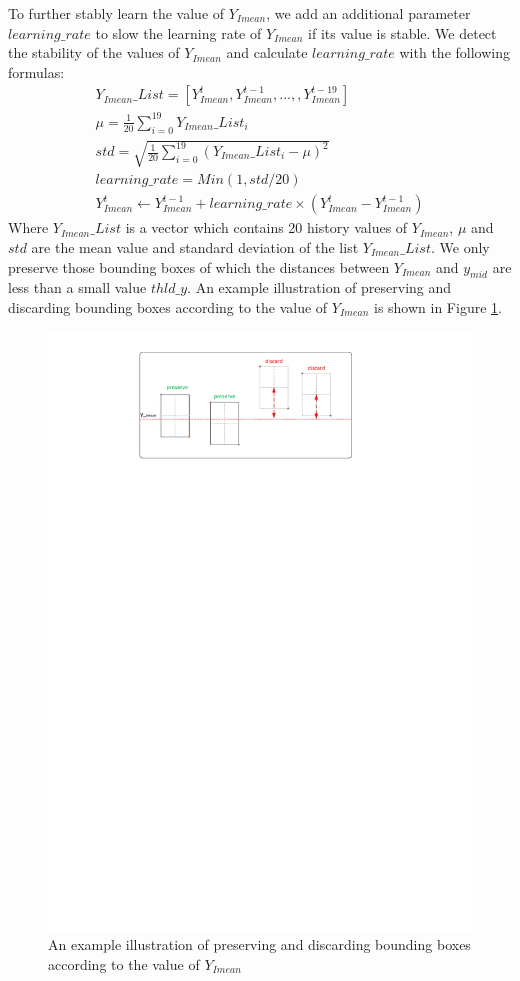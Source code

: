 To further stably learn the value of \(Y_{Imean}\), we add an additional parameter \(learning\_rate\) to slow the learning rate of \(Y_{Imean}\) if its value is stable. We detect the stability of the values of \(Y_{Imean}\) and calculate \(learning\_rate\) with the following formulas: 
\begin{eqnarray}
	Y_{Imean}\_List = [Y_{Imean}^t,Y_{Imean}^{t-1},...,,Y_{Imean}^{t-19}] \\
	\mu = \frac{1}{20}\sum_{i=0}^{19}Y_{Imean}\_List_i \\
	std = \sqrt{\frac{1}{20}\sum_{i=0}^{19}(Y_{Imean}\_List_i - \mu)^2} \\
	learning\_rate = Min(1,std/20) \\
	Y_{Imean}^t \leftarrow Y_{Imean}^{t-1} + learning\_rate \times (Y_{Imean}^{t} - Y_{Imean}^{t-1})
\end{eqnarray}
Where \(Y_{Imean}\_List\) is a vector which contains 20 history values of \(Y_{Imean}\), \(\mu\) and \(std\) are the mean value and standard deviation of the list \(Y_{Imean}\_List\).
We only preserve those bounding boxes of which the distances between \(Y_{Imean}\) and \(y_{mid}\) are less than a small value \(thld\_y\). An example illustration of preserving and discarding bounding boxes according to the value of \(Y_{Imean}\) is shown in Figure \ref{fig:y_mean}.
\begin{figure}
	\includegraphics[trim=2cm 23cm 0cm 1cm]{fig01/y_mean.pdf}
	\caption{An example illustration of preserving and discarding bounding boxes according to the value of \(Y_{Imean}\)}
	\label{fig:y_mean}
\end{figure}
